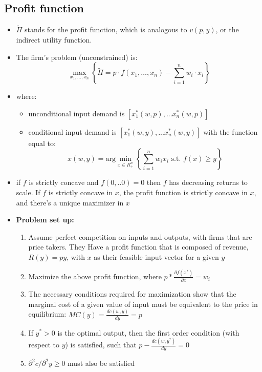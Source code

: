 \documentclass{article}
\begin{document}
\subsection{Profit function}
\begin{itemize}
    \item \( \tilde{\Pi} \) stands for the profit function, which is analogous to $v(p,y)$, or the indirect utility function. 
    \item The firm's problem (unconstrained) is: 
    \[
    \max_{x_1, \dots, x_n} \left\{ \tilde{\Pi} = p \cdot f(x_1, \dots, x_n) - \sum_{i=1}^n w_i \cdot x_i \right\}
    \]
    \item where: 
    \begin{itemize}
        \item unconditional input demand is $[x_1^*(w,p),...x_n^*(w,p)]$ 
        \item conditional input demand is $[x_1^*(w,y),...x_n^*(w,y)]$ with the function equal to: 
        \[
            x(w,y) = \text{arg}\min_{x \in R_{+}^n} \left\{ \sum_{i=1}^n w_ix_i \text{ s.t. } f(x) \geq y \right\}
        \]
    \end{itemize}
    \item if $f$ is strictly concave and $f(0,..0) = 0$ then $f$ has decreasing returns to scale. If $f$ is strictly concave in $x$, the profit function is strictly concave in $x$, and there's a unique maximizer in $x$
    \item \textbf{Problem set up:}
    \begin{enumerate}
        \item Assume perfect competition on inputs and outputs, with firms that are price takers. They Have a profit function that is composed of revenue, $R(y) = py$, with $x$ as their feasible input vector for a given $y$
        \item Maximize the above profit function, where $p*\frac{\partial f(x^*)}{\partial x} = w_i$
        \item The necessary conditions required for maximization show that the marginal cost of a given value of input must be equivalent to the price in equilibrium: $MC(y) = \frac{dc(w,y)}{dy} = p$
        \item If $y^* > 0$ is the optimal output, then the first order condition (with respect to $y$) is satisfied, such that $p-\frac{dc(w,y^*)}{dy} = 0$
        \item $\partial ^2 c / \partial ^2 y \geq 0$ must also be satisfied
    \end{enumerate}
\end{itemize}
\end{document}
